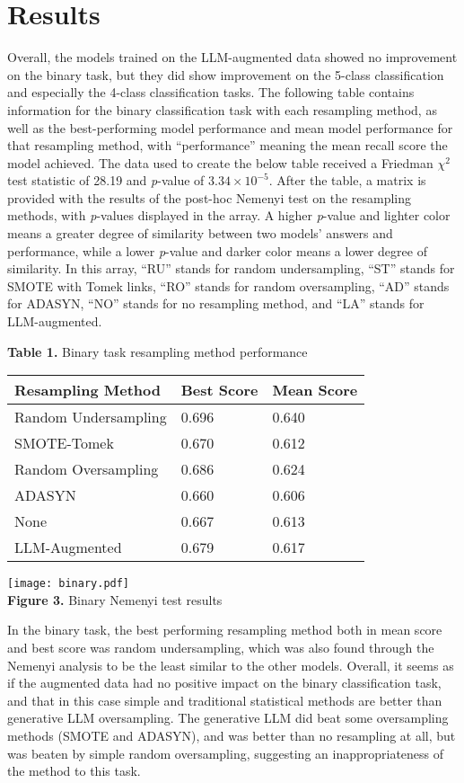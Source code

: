 \documentclass[runningheads]{llncs}
\newenvironment{nscenter}
 {\parskip=0pt\par\nopagebreak\centering}
 {\par\noindent\ignorespacesafterend}
\begin{document}
{\parskip=0pt
\section{Results}
Overall, the models trained on the LLM-augmented data showed no improvement on the binary task, but they did show improvement on the 5-class classification and especially the 4-class classification tasks. The following table contains information for the binary classification task with each resampling method, as well as the best-performing model performance and mean model performance for that resampling method, with ``performance'' meaning the mean recall score the model achieved. The data used to create the below table received a Friedman $\chi^2$ test statistic of 28.19 and \emph{p}-value of $3.34 \times 10^{-5}$. After the table, a matrix is provided with the results of the post-hoc Nemenyi test on the resampling methods, with \emph{p}-values displayed in the array. A higher \emph{p}-value and lighter color means a greater degree of similarity between two models' answers and performance, while a lower \emph{p}-value and darker color means a lower degree of similarity. In this array, ``RU'' stands for random undersampling, ``ST'' stands for SMOTE with Tomek links, ``RO'' stands for random oversampling, ``AD'' stands for ADASYN, ``NO'' stands for no resampling method, and ``LA'' stands for LLM-augmented.}
\begin{nscenter}
{\bf Table 1.} Binary task resampling method performance\\

\begin{tabular}{|l|l|l|}
\hline
Resampling Method & Best Score & Mean Score \\\hline
Random Undersampling & 0.696 & 0.640 \\\hline
SMOTE-Tomek & 0.670 & 0.612 \\\hline
Random Oversampling & 0.686 & 0.624 \\\hline
ADASYN & 0.660 & 0.606 \\\hline
None & 0.667 & 0.613 \\\hline
LLM-Augmented & 0.679 & 0.617 \\\hline
\end{tabular}

\texttt{[image: binary.pdf]}\\
{\bf Figure 3.} Binary Nemenyi test results
\end{nscenter}
In the binary task, the best performing resampling method both in mean score and best score was random undersampling, which was also found through the Nemenyi analysis to be the least similar to the other models. Overall, it seems as if the augmented data had no positive impact on the binary classification task, and that in this case simple and traditional statistical methods are better than generative LLM oversampling. The generative LLM did beat some oversampling methods (SMOTE and ADASYN), and was better than no resampling at all, but was beaten by simple random oversampling, suggesting an inappropriateness of the method to this task.
\end{document}
